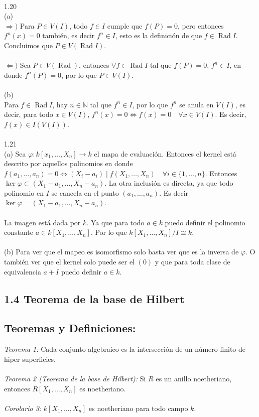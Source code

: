 \documentclass{article}
\begin{document}
\\
1.20
\\
(a)
\\
$\Longrightarrow)$ Para $P \in V(I)$, todo $f \in I$ cumple que $f(P)=0$, pero entonces $f^n(x)=0$ también, es decir $f^{n} \in I$, esto es la definición de que $f \in \operatorname{Rad}{I}$. Concluimos que $P \in V(\operatorname{Rad}{I})$.
\\
\\
$\Longleftarrow)$ Sea $P \in V(\operatorname{Rad})$, entonces $\forall f \in \operatorname{Rad}{I}$ tal que $f(P)=0$, $f^n \in I$, en donde $f^n(P)=0$, por lo que $P \in V(I)$.
\\
\\
(b)
\\
Para $f \in \operatorname{Rad}{I}$, hay $n \in \mathbb{N}$ tal que $f^n \in I$, por lo que $f^n$ se anula en $V(I)$, es decir, para todo $x \in V(I)$, $f^n(x)=0 \Longleftrightarrow f(x)=0 \quad \forall x \in V(I)$. Es decir, $f(x) \in I(V(I))$. 
\\
\\
1.21
\\
(a) Sea $\varphi: k[x_1, \dots, X_n] \to k$ el mapa de evaluación. Entonces el kernel está descrito por aquellos polinomios en donde $f(a_1, \dots, a_n)=0 \Longleftrightarrow (X_i - a_i) \mid f(X_1, \dots , X_n) \quad \forall i \in \{ 1, \dots, n\}$. Entonces $\ker{\varphi} \subset (X_1 - a_1, \dots, X_n - a_n)$. La otra inclusión es directa, ya que todo polinomio en $I$ se cancela en el punto $(a_1, \dots, a_n)$. Es decir $\ker{\varphi}=(X_1 - a_1, \dots, X_n - a_n)$.
\\
\\
La imagen está dada por $k$. Ya que para todo $a \in k$ puedo definir el polinomio constante $a \in k[X_1, \dots, X_n]$. Por lo que $k[X_1, \dots , X_n]/I \cong k$.
\\
\\
(b) Para ver que el mapeo es isomorfismo solo basta ver que es la inversa de $\varphi$. O también ver que el kernel solo puede ser el $(0)$ y que para toda clase de equivalencia $a + I$ puedo definir $a \in k$.
\subsection*{1.4 Teorema de la base de Hilbert}
\subsection*{Teoremas y Definiciones:}
\textit{Teorema 1:} Cada conjunto algebraico es la intersección de un número finito de hiper superficies.
\\
\\
\textit{Teorema 2 (Teorema de la base de Hilbert):} Si $R$ es un anillo noetheriano, entonces $R[X_1, \dots, X_n]$ es noetheriano.
\\
\\
\textit{Corolario 3:} $k[X_1, \dots, X_n]$ es noetheriano para todo campo $k$.
\end{document}
